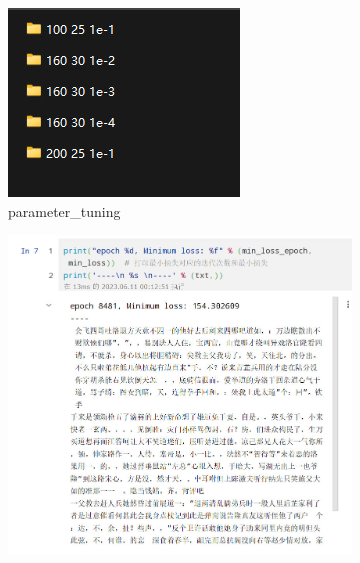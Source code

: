 \documentclass[letterpaper,12pt]{article}
\begin{document}
	
	\begin{figure}[htbp] 
		\centering 
		\begin{subfigure}{0.3\textwidth}
			\includegraphics[width=\linewidth]{WRNN/parameter_tuning}
			\captionsetup{font=scriptsize}
			\caption{parameter\_tuning}
			\label{fig: WRNN_parameter_tuning}
		\end{subfigure} 
		\begin{subfigure}{0.3\textwidth}
			\includegraphics[width=\linewidth]{WRNN/result_1}

\end{subfigure}
\end{figure}
\end{document}
